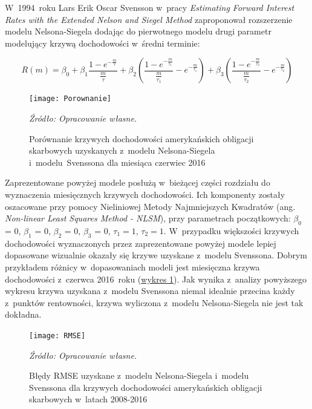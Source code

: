 \noindent W~1994~roku Lars Erik Oscar Svensson w~pracy \textit{Estimating Forward Interest Rates with the Extended Nelson and Siegel Method}\cite{svensson02} zaproponował rozszerzenie modelu Nelsona-Siegela dodając do pierwotnego modelu drugi parametr modelujący krzywą dochodowości w~średni terminie: 

\begin{equation}
R(m)=\beta_0 + \beta_1 \frac{1-e^{-\frac{m}{\tau}}}{\frac{m}{\tau}} + \beta_2 ( \frac{1-e^{-\frac{m}{\tau_1}}}{\frac{m}{\tau_1}} - e^{-\frac{m}{\tau_1}}) + \beta_3 ( \frac{1-e^{-\frac{m}{\tau_2}}}{\frac{m}{\tau_2}} - e^{-\frac{m}{\tau_2}})
\end{equation} 

\hypertarget{fig1}{}
\begin{figure}[h]
\begin{centering}
  \texttt{[image: Porownanie]}
  \captionsetup{format=hang}
   \caption{Porównanie krzywych dochodowości amerykańskich obligacji skarbowych uzyskanych z~modelu Nelsona-Siegela i~modelu~Svenssona dla miesiąca czerwiec 2016}
\end{centering}
\begin{flushleft}
\hspace{1cm}\textit{\footnotesize{Źródło: Opracowanie własne.}} \\
\end{flushleft}
\end{figure}

Zaprezentowane powyżej modele posłużą w~bieżącej części rozdziału do wyznaczenia miesięcznych krzywych dochodowości. Ich komponenty zostały oszacowane przy pomocy Nieliniowej Metody Najmniejszych Kwadratów (ang. \textit{Non-linear Least Squares Method - NLSM}), przy parametrach początkowych: $\beta_0$ = 0, $\beta_1$ = 0, $\beta_2$ = 0, $\beta_3$ = 0, $\tau_1 = 1$, $\tau_2 = 1$. W~przypadku większości krzywych dochodowości wyznaczonych przez zaprezentowane powyżej modele lepiej dopasowane wizualnie okazały się krzywe uzyskane z~modelu Svenssona. Dobrym przykładem różnicy w~dopasowaniach modeli jest miesięczna krzywa dochodowości z~czerwca 2016~roku (\hyperlink{fig1}{wykres 1}). Jak wynika z~analizy powyższego wykresu krzywa uzyskana z~modelu Svenssona niemal idealnie przecina każdy z~punktów rentowności, krzywa wyliczona z~modelu Nelsona-Siegela nie jest tak dokładna. 

\vspace{0.25cm}
\hypertarget{fig2}{}
\begin{figure}[h]
\begin{centering}
  \texttt{[image: RMSE]}
  	\captionsetup{format=hang}
    \caption{Błędy RMSE uzyskane z~modelu Nelsona-Siegela i~modelu Svenssona dla krzywych dochodowości amerykańskich obligacji skarbowych w~latach 2008-2016}      
\end{centering}
\begin{flushleft}
\hspace{1cm}\textit{\footnotesize{Źródło: Opracowanie własne.}} \\
\end{flushleft}
\vspace{-0.5cm}
\end{figure}

